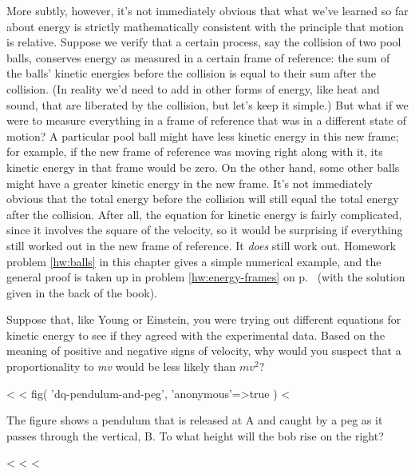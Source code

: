 More subtly, however, it's not immediately obvious that what
we've learned so far about energy is strictly mathematically
consistent with the principle that motion is relative.
Suppose we verify that a certain process, say the collision
of two pool balls, conserves energy as measured in a certain
frame of reference: the sum of the balls' kinetic energies
before the collision is equal to their sum after the
collision. (In reality we'd need to add in other forms of
energy, like heat and sound, that are liberated by the
collision, but let's keep it simple.) But what if we were to
measure everything in a frame of reference that was in a
different state of motion? A particular pool ball might have
less kinetic energy in this new frame; for example, if the
new frame of reference was moving right along with it, its
kinetic energy in that frame would be zero. On the other
hand, some other balls might have a greater kinetic energy
in the new frame. It's not immediately obvious that the
total energy before the collision will still equal the total
energy after the collision. After all, the equation for
kinetic energy is fairly complicated, since it involves the
square of the velocity, so it would be surprising if
everything still worked out in the new frame of reference.
It \emph{does} still work out. Homework problem \ref{hw:balls} in this
chapter gives a simple numerical example, and the general
proof is taken up in problem \ref{hw:energy-frames} on p.~\pageref{hw:energy-frames} (with the solution
given in the back of the book).

\startdqs

\begin{dq}
Suppose that, like Young or Einstein, you were trying out
different equations for kinetic energy to see if they agreed
with the experimental data. Based on the meaning of positive
and negative signs of velocity, why would you suspect that
a proportionality to \emph{mv} would be less likely than $mv^2?$
\end{dq}

<%
<%
  fig(
    'dq-pendulum-and-peg',
    {
      'anonymous'=>true
    }
  )
<%
\begin{dq}\label{dq:pendulum-and-peg}
The figure
 shows a pendulum that is released at A and
caught by a peg as it passes through the vertical, B. To
what height will the bob rise on the right?
\end{dq}

<%
<%
<%

